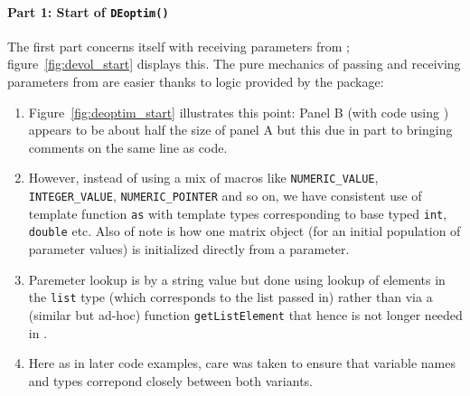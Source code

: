 \documentclass[nojss,shortnames,article]{jss}
\begin{document}
\paragraph{Part 1: Start of \texttt{DEoptim()}} The first part concerns
itself with receiving parameters from ;
figure~\ref{fig:devol_start} displays this. The pure mechanics of passing and
receiving parameters from  are easier thanks to logic provided by
the  package:
\begin{enumerate}
\item Figure~\ref{fig:deoptim_start} illustrates this point: Panel B (with code
  using ) appears to be about half the size of panel A but this
  due in part to bringing comments on the same line as code.
\item However, instead of using a mix of macros like \verb|NUMERIC_VALUE|,
  \verb|INTEGER_VALUE|, \texttt{NUMERIC\_POINTER} and so on, we have consistent
  use of  template function \verb|as| with template types
  corresponding to base typed \verb|int|, \verb|double| etc. Also of note is
  how one matrix object (for an initial population of parameter values) is
  initialized directly from a parameter.
\item Paremeter lookup is by a string value but done using  lookup
  of elements in the \verb|list| type (which corresponds to the 
  list passed in) rather than via a (similar but ad-hoc) function
  \verb|getListElement| that hence is not longer needed in .
\item Here as in later code examples, care was taken to ensure that variable
  names and types correpond closely between both variants.
\end{enumerate}
\end{document}
